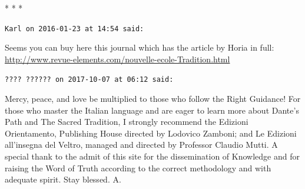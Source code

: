 
\begin{center}* * *\end{center}

\begin{footnotesize}\begin{sffamily}



\texttt{Karl on 2016-01-23 at 14:54 said: }

Seems you can buy here this journal which has the article by Horia in full: \url{http://www.revue-elements.com/nouvelle-ecole-Tradition.html}


\hfill

\texttt{???? ?????? on 2017-10-07 at 06:12 said: }

Mercy, peace, and love be multiplied to those who follow the Right Guidance! For those who master the Italian language and are eager to learn more about Dante's Path and The Sacred Tradition, I strongly recommend the Edizioni Orientamento, Publishing House directed by Lodovico Zamboni; and Le Edizioni all'insegna del Veltro, managed and directed by Professor Claudio Mutti. A special thank to the admit of this site for the dissemination of Knowledge and for raising the Word of Truth according to the correct methodology and with adequate spirit. Stay blessed. A.


\end{sffamily}\end{footnotesize}
